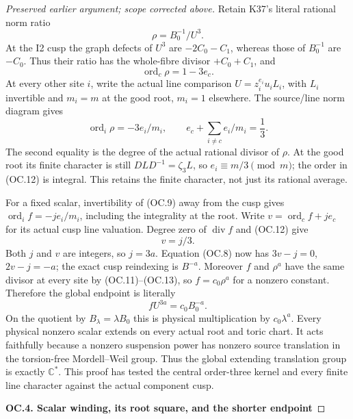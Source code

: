 \begin{proof}[Preserved earlier argument; scope corrected above]
Retain K37's literal rational norm ratio
\[
                   \rho=B_0^{-1}/U^3.                    \tag{OC.10}
\]
At the I2 cusp the graph defects of \(U^3\) are
\(-2C_0-C_1\), whereas those of \(B_0^{-1}\) are
\(-C_0\). Thus their ratio has the whole-fibre divisor
\(+C_0+C_1\), and
\[
                  \operatorname{ord}_c\rho=1-3e_c.       \tag{OC.11}
\]
At every other site \(i\), write the actual line comparison
\(U=z_i^{e_i}u_i L_i\), with \(L_i\) invertible and
\(m_i=m\) at the good root, \(m_i=1\) elsewhere. The
source/line norm diagram gives
\[
 \operatorname{ord}_i\rho=-3e_i/m_i,\qquad
             e_c+\sum_{i\ne c}e_i/m_i=\frac13.           \tag{OC.12}
\]
The second equality is the degree of the actual rational divisor
of \(\rho\). At the good root its finite character is still
\(DLD^{-1}=\zeta_3L\), so \(e_i\equiv m/3\pmod m\);
the order in (OC.12) is integral. This retains the finite character,
not just its rational average.

For a fixed scalar, invertibility of (OC.9) away from the cusp
gives \(\operatorname{ord}_i f=-je_i/m_i\), including the
integrality at the root. Write
\(v=\operatorname{ord}_c f+je_c\) for its actual cusp line
valuation. Degree zero of \(\operatorname{div}f\) and
(OC.12) give
\[
                              v=j/3.                     \tag{OC.13}
\]
Both \(j\) and \(v\) are integers, so \(j=3a\).
Equation (OC.8) now has \(3v-j=0\), \(2v-j=-a\);
the exact cusp reindexing is \(B^{-a}\). Moreover \(f\)
and \(\rho^a\) have the same divisor at every site by
(OC.11)--(OC.13), so \(f=c_0\rho^a\) for a nonzero
constant. Therefore the global endpoint is literally
\[
                       fU^{3a}=c_0B_0^{-a}.              \tag{OC.14}
\]
On the quotient by \(B_\lambda=\lambda B_0\) this is
physical multiplication by \(c_0\lambda^a\). Every physical
nonzero scalar extends on every actual root and toric chart.
It acts faithfully because a nonzero suspension power has nonzero
source translation in the torsion-free Mordell--Weil group. Thus
the global extending translation group is exactly \(\mathbb C^*\).
This proof has tested the central order-three kernel and every finite
line character against the actual component cusp.

\par

\medskip\noindent\textbf{OC.4. Scalar winding, its root square, and the shorter endpoint}

\par\nobreak


\end{proof}
